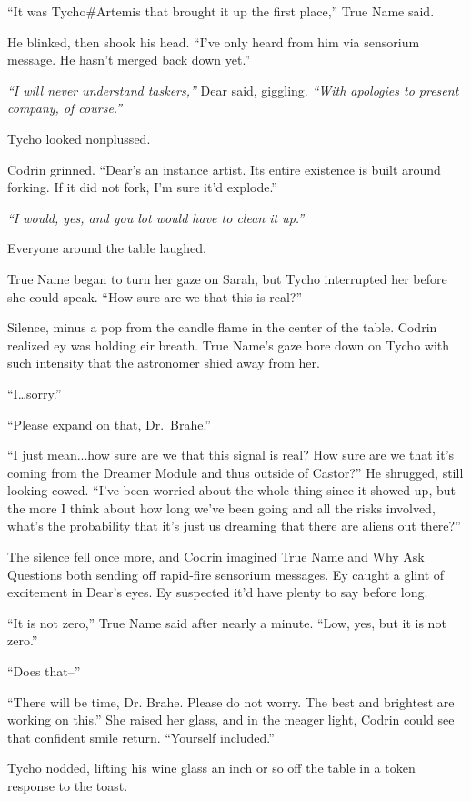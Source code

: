 ``It was Tycho\#Artemis that brought it up the first place,'' True Name said.

He blinked, then shook his head. ``I've only heard from him via sensorium message. He hasn't merged back down yet.''

\emph{``I will never understand taskers,''} Dear said, giggling. \emph{``With apologies to present company, of course.''}

Tycho looked nonplussed.

Codrin grinned. ``Dear's an instance artist. Its entire existence is built around forking. If it did not fork, I'm sure it'd explode.''

\emph{``I would, yes, and you lot would have to clean it up.''}

Everyone around the table laughed.

True Name began to turn her gaze on Sarah, but Tycho interrupted her before she could speak. ``How sure are we that this is real?''

Silence, minus a pop from the candle flame in the center of the table. Codrin realized ey was holding eir breath. True Name's gaze bore down on Tycho with such intensity that the astronomer shied away from her.

``I\ldots{}sorry.''

``Please expand on that, Dr.~Brahe.''

``I just mean...how sure are we that this signal is real? How sure are we that it's coming from the Dreamer Module and thus outside of Castor?'' He shrugged, still looking cowed. ``I've been worried about the whole thing since it showed up, but the more I think about how long we've been going and all the risks involved, what's the probability that it's just us dreaming that there are aliens out there?''

The silence fell once more, and Codrin imagined True Name and Why Ask Questions both sending off rapid-fire sensorium messages. Ey caught a glint of excitement in Dear's eyes. Ey suspected it'd have plenty to say before long.

``It is not zero,'' True Name said after nearly a minute. ``Low, yes, but it is not zero.''

``Does that--''

``There will be time, Dr. Brahe. Please do not worry. The best and brightest are working on this.'' She raised her glass, and in the meager light, Codrin could see that confident smile return. ``Yourself included.''

Tycho nodded, lifting his wine glass an inch or so off the table in a token response to the toast.

